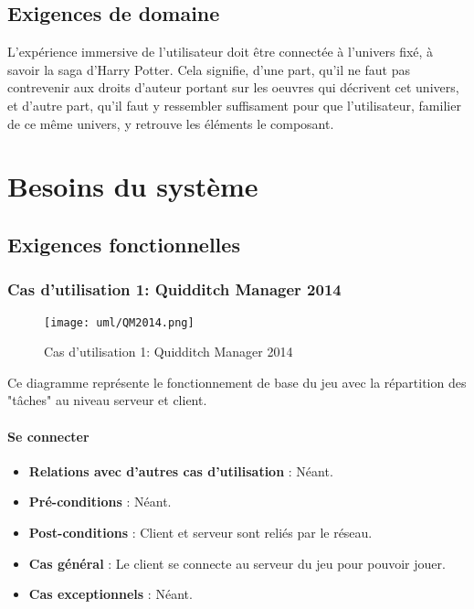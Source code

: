\documentclass[a4paper,titlepage]{scrreprt}
\begin{document}
\section{Exigences de domaine}
  L'expérience immersive de l'utilisateur doit être connectée à l'univers fixé, 
  à savoir la saga d'Harry Potter. Cela signifie, d'une part, 
  qu'il ne faut pas contrevenir aux droits d'auteur portant sur les oeuvres 
  qui décrivent cet univers, et d'autre part, qu'il faut y ressembler suffisament pour que 
  l'utilisateur, familier de ce même univers, y retrouve les éléments le composant.
\chapter{Besoins du système}
\section{Exigences fonctionnelles}
 \subsection{Cas d'utilisation 1: Quidditch Manager 2014}
  \begin{figure}[H]
    \center
    \texttt{[image: uml/QM2014.png]}
    \caption{Cas d'utilisation 1: Quidditch Manager 2014}
  \end{figure}	
    Ce diagramme représente le fonctionnement de base du jeu avec la répartition des "tâches" au niveau serveur et client.
    \subsubsection{Se connecter}
      \begin{itemize}
        \item \textbf{Relations avec d'autres cas d'utilisation}  : Néant.
        \item \textbf{Pré-conditions} : Néant.
        \item \textbf{Post-conditions} : Client et serveur sont reliés par le réseau.
        \item \textbf{Cas général} : Le client se connecte au serveur du jeu pour pouvoir jouer. 
        \item \textbf{Cas exceptionnels} : Néant.
      \end{itemize}
\end{document}
